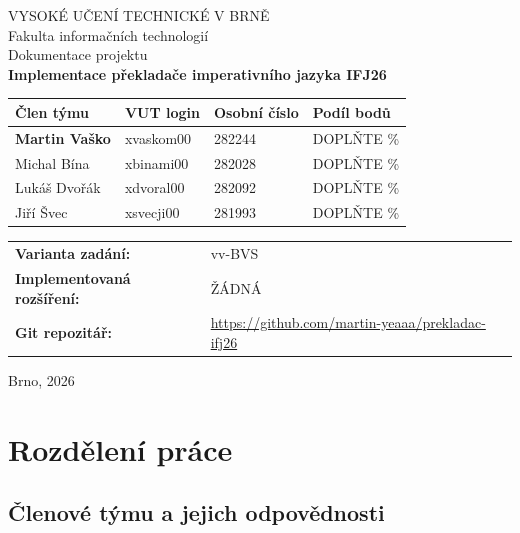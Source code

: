 \documentclass[10pt,a4paper]{article}
\newcommand{\nazevprojektu}{Implementace překladače imperativního jazyka IFJ26}
\newcommand{\varianta}{vv-BVS}
\newcommand{\gitrepo}{https://github.com/martin-yeaaa/prekladac-ifj26}
\begin{document}
\begin{titlepage}
    \centering
    {\large VYSOKÉ UČENÍ TECHNICKÉ V BRNĚ}\\[0.3cm]
    {\large Fakulta informačních technologií}\\[2.0cm]

    {\Large Dokumentace projektu}\\[0.5cm]
    {\huge\bfseries \nazevprojektu}\\[1.5cm]

    \begin{tabularx}{\textwidth}{|l|Y|Y|Y|}
        \hline
        \textbf{Člen týmu} & \textbf{VUT login} & \textbf{Osobní číslo} & \textbf{Podíl bodů} \\
        \hline
        \textbf{Martin Vaško} & xvaskom00 & 282244 & DOPLŇTE \% \\
        \hline
        Michal Bína & xbinami00 & 282028 & DOPLŇTE \% \\
        \hline
        Lukáš Dvořák & xdvoral00 & 282092 & DOPLŇTE \% \\
        \hline
        Jiří Švec & xsvecji00 & 281993 & DOPLŇTE \% \\
        \hline
    \end{tabularx}

    \vspace{1.0cm}
    \begin{tabularx}{\textwidth}{lY}
        \textbf{Varianta zadání:} & \varianta \\
        \textbf{Implementovaná rozšíření:} &ŽÁDNÁ \\
        \textbf{Git repozitář:} & \url{\gitrepo} \\
    \end{tabularx}

    \vfill
    {\large Brno, 2026}
\end{titlepage}

\tableofcontents
\newpage

\section{Rozdělení práce}

\subsection{Členové týmu a jejich odpovědnosti}
\end{document}
